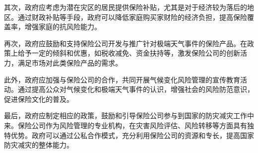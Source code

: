 其次，政府应考虑为潜在灾区的居民提供保险补贴，尤其是对于经济较为落后的地区。通过财政补贴等手段，政府可以降低家庭购买家财险的经济负担，提高保险覆盖率，增强家庭的抗风险能力。

再次，政府应鼓励和支持保险公司开发与推广针对极端天气事件的保险产品。在政策上给予一定的倾斜和优惠，如税收减免、资金扶持等，激发保险公司的创新活力，满足市场对此类保险产品的需求。

此外，政府应加强与保险公司的合作，共同开展气候变化风险管理的宣传教育活动。通过提高公众对气候变化和极端天气事件的认识，增强社会的风险防范意识，促进保险文化的普及。

最后，政府应制定相应的政策，鼓励和引导保险公司参与到国家的防灾减灾工作中来。保险公司作为风险管理的专业机构，在灾害风险评估、风险转移等方面具有独特优势。政府可以通过公私合作模式，充分利用保险公司的资源和专长，提高国家防灾减灾的整体能力。
